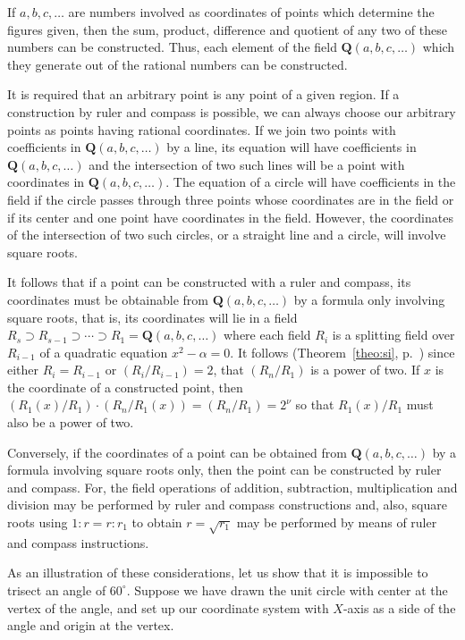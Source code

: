 \documentclass[10pt,leqno]{article}
\theoremstyle{definition}
\def\QQ{\mathbf{Q}}
\begin{document}
If $a,b,c,\ldots$ are numbers involved as coordinates of points which determine the figures given, then the sum, product, difference and quotient of any two of these numbers can be constructed.
Thus, each element of the field $\QQ(a,b,c,\ldots)$ which they generate out of the rational numbers can be constructed.

It is required that an arbitrary point is any point of a given region.
If a construction by ruler and compass is possible, we can always choose our arbitrary points as points having rational coordinates.
If we join two points with coefficients in $\QQ(a,b,c,\ldots)$ by a line, its equation will have coefficients in $\QQ(a,b,c,\ldots)$ and the intersection of two such lines will be a point with coordinates in $\QQ(a,b,c,\ldots)$.
The equation of a circle will have coefficients in the field if the circle passes through three points whose coordinates are in the field or if its center and one point have coordinates in the field.
However, the coordinates of the intersection of two such circles, or a straight line and a circle, will involve square roots.

It follows that if a point can be constructed with a ruler and compass, its coordinates must be obtainable from $\QQ(a,b,c,\ldots)$ by a formula only involving square roots, that is, its coordinates will lie in a field $R_s \supset R_{s-1} \supset \cdots \supset R_1 = \QQ(a,b,c,\ldots)$ where each field $R_i$ is a splitting field over $R_{i-1}$ of a quadratic equation $x^2 - \alpha = 0$.
It follows (Theorem~\ref{theo:si}, p.~\pageref{theo:si}) since either $R_i = R_{i-1}$ or $(R_i / R_{i-1}) = 2$, that $(R_n / R_1)$ is a power of two.
If $x$ is the coordinate of a constructed point, then $(R_1(x)/R_1) \cdot (R_n/R_1(x)) = (R_n/R_1) = 2^\nu$ so that $R_1(x)/R_1$ must also be a power of two.

Conversely, if the coordinates of a point can be obtained from $\QQ(a,b,c,\ldots)$ by a formula involving square roots only, then the point can be constructed by ruler and compass.
For, the field operations of addition, subtraction, multiplication and division may be performed by ruler and compass constructions and, also, square roots using $1:r = r:r_1$ to obtain $r = \sqrt{r_1}$ may be performed by means of ruler and compass instructions.

As an illustration of these considerations, let us show that it is impossible to trisect an angle of $60^\circ$.
Suppose we have drawn the unit circle with center at the vertex of the angle, and set up our coordinate system with $X$-axis as a side of the angle and origin at the vertex.
\end{document}
